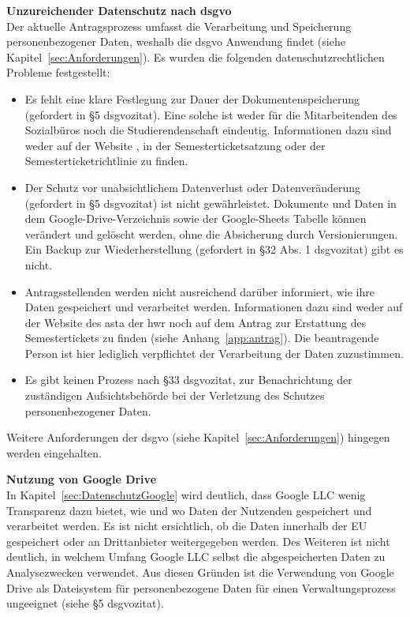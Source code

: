 \textbf{Unzureichender Datenschutz nach \gls{dsgvo}}\\
Der aktuelle Antragsprozess umfasst die Verarbeitung und Speicherung personenbezogener Daten, weshalb die \gls{dsgvo} Anwendung findet (siehe Kapitel~\ref{sec:Anforderungen}). Es wurden die folgenden datenschutzrechtlichen Probleme festgestellt:  
    \begin{itemize}
    \item Es fehlt eine klare Festlegung zur Dauer der Dokumentenspeicherung (gefordert in §5 \gls{dsgvozitat}). Eine solche ist weder für die Mitarbeitenden des Sozialbüros noch die Studierendenschaft eindeutig. Informationen dazu sind weder auf der Website ,  in der Semesterticketsatzung  oder der Semesterticketrichtlinie   zu finden.
    \item Der Schutz vor unabsichtlichem Datenverlust oder Datenveränderung (gefordert in §5 \gls{dsgvozitat}) ist nicht gewährleistet. Dokumente und Daten in dem Google-Drive-Verzeichnis sowie der Google-Sheets Tabelle können verändert und gelöscht werden, ohne die Absicherung durch Versionierungen. Ein Backup zur Wiederherstellung (gefordert in §32 Abs. 1 \gls{dsgvozitat}) gibt es nicht. 
    \item Antragsstellenden werden nicht ausreichend darüber informiert, wie ihre Daten gespeichert und verarbeitet werden. Informationen dazu sind weder auf der Website des \gls{asta} der \gls{hwr}  noch auf dem Antrag zur Erstattung des Semestertickets zu finden (siehe Anhang~\ref{app:antrag}). Die beantragende Person ist hier lediglich verpflichtet der Verarbeitung der Daten zuzustimmen.
    \item Es gibt keinen Prozess nach §33 \gls{dsgvozitat}, zur Benachrichtung der zuständigen Aufsichtsbehörde bei der Verletzung des Schutzes personenbezogener Daten. 
    \end{itemize} 
Weitere Anforderungen der \gls{dsgvo} (siehe Kapitel~\ref{sec:Anforderungen}) hingegen werden eingehalten.

\textbf{Nutzung von Google Drive}\\
In Kapitel~\ref{sec:DatenschutzGoogle} wird deutlich, dass Google LLC wenig Transparenz dazu bietet, wie und wo Daten der Nutzenden gespeichert und verarbeitet werden. Es ist nicht ersichtlich, ob die Daten innerhalb der EU gespeichert oder an Drittanbieter weitergegeben werden. Des Weiteren ist nicht deutlich, in welchem Umfang Google LLC selbst die abgespeicherten Daten zu Analysezwecken verwendet. Aus diesen Gründen ist die Verwendung von Google Drive als Dateisystem für personenbezogene Daten für einen Verwaltungsprozess ungeeignet (siehe §5 \gls{dsgvozitat}). 

